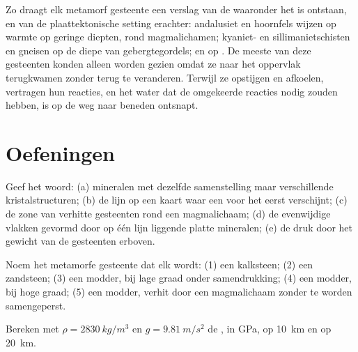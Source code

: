 Zo draagt elk metamorf gesteente een verslag van de  waaronder het
is ontstaan, en van de plaattektonische setting erachter: andalusiet en hoornfels wijzen op
warmte op geringe diepten, rond magmalichamen; kyaniet- en sillimanietschisten
en gneisen op de diepe  van gebergtegordels;  en
 op . De meeste van deze gesteenten konden alleen worden gezien
omdat ze naar het oppervlak terugkwamen zonder terug te veranderen. Terwijl ze opstijgen
en afkoelen, vertragen hun reacties, en het water dat de omgekeerde
reacties nodig zouden hebben, is op de weg naar beneden ontsnapt.

\section{Oefeningen}

\begin{exercise}[$\star$]\label{exo:g12:metamorphic-rocks:1}
Geef het woord: (a) mineralen met dezelfde samenstelling maar verschillende
kristalstructuren; (b) de lijn op een kaart waar een  voor het eerst verschijnt;
(c) de zone van verhitte gesteenten rond een magmalichaam; (d) de evenwijdige vlakken
gevormd door op één lijn liggende platte mineralen; (e) de druk door het gewicht van de
gesteenten erboven.
\end{exercise}

\begin{exercise}[$\star$]\label{exo:g12:metamorphic-rocks:2}
Noem het metamorfe gesteente dat elk  wordt: (1) een kalksteen;
(2) een zandsteen; (3) een modder, bij lage graad onder samendrukking; (4) een modder, bij hoge
graad; (5) een modder, verhit door een magmalichaam zonder te worden samengeperst.
\end{exercise}

\begin{exercise}[$\star$]\label{exo:g12:metamorphic-rocks:3}
Bereken met $\rho = \qty{2830}{kg/m^3}$ en $g = \qty{9.81}{m/s^2}$ de
, in \unit{GPa}, op \qty{10}{km} en op \qty{20}{km}.
\end{exercise}

